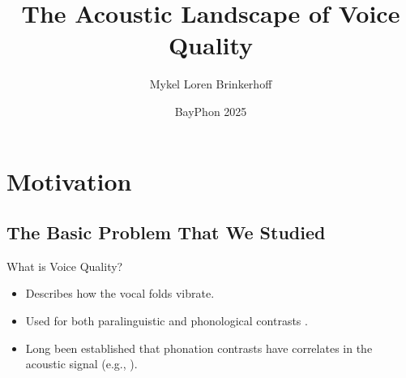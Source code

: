 \documentclass{beamer}
\title[Acoustic Landscape] %
{The Acoustic Landscape of Voice Quality}
\author[Brinkerhoff] %
{Mykel Loren Brinkerhoff}
\institute[UC Santa Cruz] %
{University of California, Santa Cruz}
\date[BayPhon 2025] %
{BayPhon 2025}
\begin{document}
\begin{frame}
  \titlepage
\end{frame}





\section{Motivation}
\subsection{The Basic Problem That We Studied}
\begin{frame}{What is Voice Quality?}

  \begin{itemize}
  \item
    Describes how the vocal folds vibrate.
  \item
    Used for both paralinguistic \citep{laverVoiceQualityIndexical1968,podesvaStanceWindowLanguageRace2016} and phonological contrasts \citep{espositoCrosslinguisticPatternsPhonation2020}.
  \item Long been established that phonation contrasts have correlates in the acoustic signal (e.g., \cite{fischer-jorgensenPhoneticAnalysisBreathy1968}).
  \end{itemize}
\end{frame}
\end{document}
